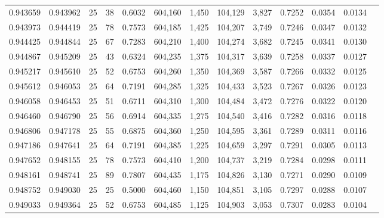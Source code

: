 \begin{tabular}{rrrrrrrrrrrrr}
0.943659 & 0.943962 &    25 &  38 &                                     0.6032 & 604,160 &   1,450 & 104,129 &   3,827 & 0.7252 & 0.0354 & 0.0134 \\
0.943973 & 0.944419 &    25 &  78 &                                     0.7573 & 604,185 &   1,425 & 104,207 &   3,749 & 0.7246 & 0.0347 & 0.0132 \\
0.944425 & 0.944844 &    25 &  67 &                                     0.7283 & 604,210 &   1,400 & 104,274 &   3,682 & 0.7245 & 0.0341 & 0.0130 \\
0.944867 & 0.945209 &    25 &  43 &                                     0.6324 & 604,235 &   1,375 & 104,317 &   3,639 & 0.7258 & 0.0337 & 0.0127 \\
0.945217 & 0.945610 &    25 &  52 &                                     0.6753 & 604,260 &   1,350 & 104,369 &   3,587 & 0.7266 & 0.0332 & 0.0125 \\
0.945612 & 0.946053 &    25 &  64 &                                     0.7191 & 604,285 &   1,325 & 104,433 &   3,523 & 0.7267 & 0.0326 & 0.0123 \\
0.946058 & 0.946453 &    25 &  51 &                                     0.6711 & 604,310 &   1,300 & 104,484 &   3,472 & 0.7276 & 0.0322 & 0.0120 \\
0.946460 & 0.946790 &    25 &  56 &                                     0.6914 & 604,335 &   1,275 & 104,540 &   3,416 & 0.7282 & 0.0316 & 0.0118 \\
0.946806 & 0.947178 &    25 &  55 &                                     0.6875 & 604,360 &   1,250 & 104,595 &   3,361 & 0.7289 & 0.0311 & 0.0116 \\
0.947186 & 0.947641 &    25 &  64 &                                     0.7191 & 604,385 &   1,225 & 104,659 &   3,297 & 0.7291 & 0.0305 & 0.0113 \\
0.947652 & 0.948155 &    25 &  78 &                                     0.7573 & 604,410 &   1,200 & 104,737 &   3,219 & 0.7284 & 0.0298 & 0.0111 \\
0.948161 & 0.948741 &    25 &  89 &                                     0.7807 & 604,435 &   1,175 & 104,826 &   3,130 & 0.7271 & 0.0290 & 0.0109 \\
0.948752 & 0.949030 &    25 &  25 &                                     0.5000 & 604,460 &   1,150 & 104,851 &   3,105 & 0.7297 & 0.0288 & 0.0107 \\
0.949033 & 0.949364 &    25 &  52 &                                     0.6753 & 604,485 &   1,125 & 104,903 &   3,053 & 0.7307 & 0.0283 & 0.0104 \\

\end{tabular}
